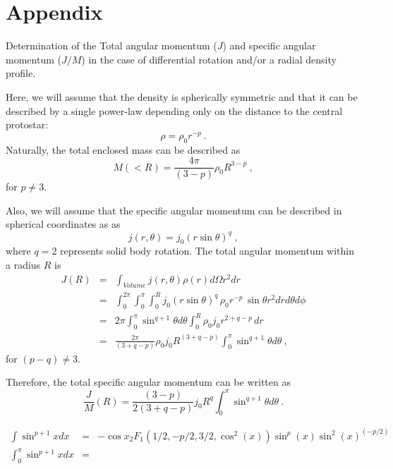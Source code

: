 \section{Appendix}
Determination of the Total angular momentum ($J$) and specific angular momentum ($J/M$) in the case of differential rotation and/or a radial density profile.

Here, we will assume that the density is spherically symmetric and that it can be described 
by a single power-law depending only on the distance to the central protostar:
\begin{equation}%
\rho = \rho_0 r^{-p}~.
\end{equation}
Naturally, the total enclosed mass can be described as 
\begin{equation}
M(<R) = \frac{4\pi}{(3-p)} \rho_0 R^{3-p}~,
\end{equation}
for $p\ne 3$.

Also, we will assume that the specific angular momentum can be described in spherical coordinates as as
\begin{equation}
j(r,\theta) = j_0 ( r \sin \theta)^q~,
\end{equation}
where $q=2$ represents solid body rotation.
%
The total angular momentum within a radius $R$ is
\begin{eqnarray}
J(R) &=& \int_{Volume} j(r,\theta) \rho(r) d\Omega r^2 dr \\
&=& \int_0^{2\pi}\int_{0}^{\pi}\int_0^R j_0 ( r \sin \theta)^q\, \rho_0 r^{-p}\, \sin\theta r^2 dr d\theta d\phi\\
&=& 2\pi \int_{0}^{\pi} \sin^{q+1} \theta d\theta \int_0^R \rho_0 j_0 r^{2+q-p} \,dr \nonumber \\
&=& \frac{2\pi}{(3+q-p)}\rho_0 j_0 R^{(3+q-p)} \int_{0}^{\pi} \sin^{q+1} \theta d\theta~,
\end{eqnarray}
for $(p-q)\ne 3$.

Therefore, the total specific angular momentum can be written as
\begin{equation}
\frac{J}{M}(R) = \frac{(3-p)}{2(3+q-p)} j_0 R^{q} 
\int_{0}^{\pi} \sin^{q+1} \theta d\theta~.
\end{equation}


\begin{eqnarray}
\int \sin^{p+1} x dx &=& -\cos{x} _2F_1(1/2, -p/2, 3/2, \cos^2(x)) \sin^p(x) \sin^2(x)^{(-p/2)}\\
\int_{0}^{\pi} \sin^{p+1} x dx &=&  
\end{eqnarray}
  
  
  
  